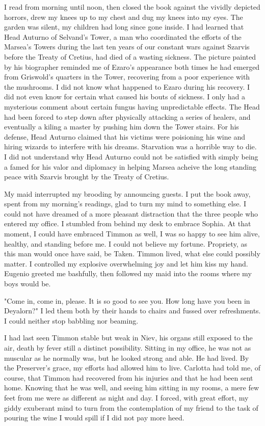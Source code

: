 \documentclass{article}
\begin{document}
I read from morning until noon, then closed the book against the vividly depicted horrors, drew my knees up to my chest and dug my knees into my eyes. The garden was silent, my children had long since gone inside. I had learned that Head Auturno of Selvand's Tower, a man who coordinated the efforts of the Marsea's Towers during the last ten years of our constant wars against Szarvis before the Treaty of Cretius, had died of a wasting sickness. The picture painted by his biographer reminded me of Ezaro's appearance both times he had emerged from Griswold's quarters in the Tower, recovering from a poor experience with the mushrooms. I did not know what happened to Ezaro during his recovery. I did not even know for certain what caused his bouts of sickness. I only had a mysterious comment about certain fungus having unpredictable effects. The Head had been forced to step down after physically attacking a series of healers, and eventually a kiling a master by pushing him down the Tower stairs. For his defense, Head Auturno claimed that his victims were poisioning his wine and hiring wizards to interfere with his dreams. Starvation was a horrible way to die. I did not understand why Head Auturno could not be satisfied with simply being a famed for his valor and diplomacy in helping Marsea acheive the long standing peace with Szarvis brought by the Treaty of Cretius. 

My maid interrupted my brooding by announcing guests. I put the book away, spent from my morning's readings, glad to turn my mind to something else. I could not have dreamed of a more pleasant distraction that the three people who entered my office. I stumbled from behind my desk to embrace Sophia. At that moment, I could have embraced Timmon as well, I was so happy to see him alive, healthy, and standing before me. I could not believe my fortune. Propriety, as this man would once have said, be Taken. Timmon lived, what else could possibly matter. I controlled my explosive overwhelming joy and let him kiss my hand. Eugenio greeted me bashfully, then followed my maid into the rooms where my boys would be. 

"Come in, come in, please. It is so good to see you. How long have you been in Deyalorn?" I led them both by their hands to chairs and fussed over refreshments. I could neither stop babbling nor beaming.

I had last seen Timmon stable but weak in Niev, his organs still exposed to the air, death by fever still a distinct possibility. Sitting in my office, he was not as muscular as he normally was, but he looked strong and able. He had lived. By the Preserver's grace, my efforts had allowed him to live. Carlotta had told me, of course, that Timmon had recovered from his injuries and that he had been sent home. Knowing that he was well, and seeing him sitting in my rooms, a mere few feet from me were as different as night and day. I forced, with great effort,  my giddy exuberant mind to turn from the contemplation of my friend to the task of pouring the wine I would spill if I did not pay more heed.
\end{document}
